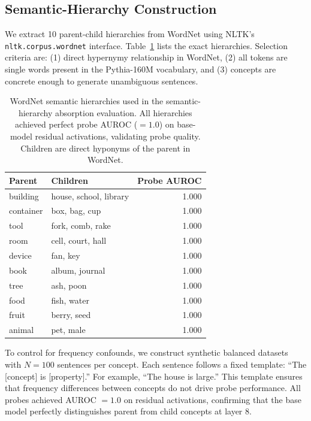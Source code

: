\documentclass{article}
\begin{document}
\subsection{Semantic-Hierarchy Construction}
\label{sec:semantic_hierarchy}

We extract 10 parent-child hierarchies from WordNet \citep{miller1995wordnet} using NLTK's \texttt{nltk.corpus.wordnet} interface. Table~\ref{tab:wordnet} lists the exact hierarchies. Selection criteria are: (1) direct hypernymy relationship in WordNet, (2) all tokens are single words present in the Pythia-160M vocabulary, and (3) concepts are concrete enough to generate unambiguous sentences.

\begin{table}[t]
\caption{WordNet semantic hierarchies used in the semantic-hierarchy absorption evaluation. All hierarchies achieved perfect probe AUROC ($= 1.0$) on base-model residual activations, validating probe quality. Children are direct hyponyms of the parent in WordNet.}
\label{tab:wordnet}
\centering
\begin{tabular}{llr}
\toprule
Parent & Children & Probe AUROC \\
\midrule
building & house, school, library & 1.000 \\
container & box, bag, cup & 1.000 \\
tool & fork, comb, rake & 1.000 \\
room & cell, court, hall & 1.000 \\
device & fan, key & 1.000 \\
book & album, journal & 1.000 \\
tree & ash, poon & 1.000 \\
food & fish, water & 1.000 \\
fruit & berry, seed & 1.000 \\
animal & pet, male & 1.000 \\
\bottomrule
\end{tabular}
\end{table}

To control for frequency confounds, we construct synthetic balanced datasets with $N = 100$ sentences per concept. Each sentence follows a fixed template: ``The [concept] is [property].'' For example, ``The house is large.'' This template ensures that frequency differences between concepts do not drive probe performance. All probes achieved AUROC $= 1.0$ on residual activations, confirming that the base model perfectly distinguishes parent from child concepts at layer 8.
\end{document}
